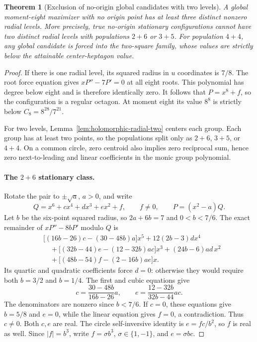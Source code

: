 \documentclass[11pt]{article}
\newtheorem{theorem}{Theorem}[section]
\theoremstyle{remark}
\numberwithin{equation}{section}
\begin{document}
\begin{theorem}[Exclusion of no-origin global candidates with two levels]
\label{thm:n8-noorigin-two-levels}
A global moment-eight maximizer with no origin point has at least
three distinct nonzero radial levels. More precisely, true no-origin
stationary configurations cannot have two distinct radial levels
with populations $2+6$ or $3+5$. For population $4+4$, any global
candidate is forced into the two-square family, whose values are
strictly below the attainable center-heptagon value.
\end{theorem}
\begin{proof}
If there is one radial level, its squared radius in $u$ coordinates
is $7/8$. The root force equation gives
$xP''-7P'=0$ at all eight roots. This polynomial has degree below
eight and is therefore identically zero. It follows that
$P=x^8+f$, so the configuration is a regular octagon. At moment eight
its value $8^8$ is strictly below $C_8=8^{28}/7^{21}$.

For two levels, Lemma~\ref{lem:holomorphic-radial-two} centers each
group. Each group has at least two points, so the populations split
only as $2+6$, $3+5$, or $4+4$. On a common circle, zero centroid
also implies zero reciprocal sum, hence zero next-to-leading and
linear coefficients in the monic group polynomial.

\paragraph{The $2+6$ stationary class.}
Rotate the pair to $\pm\sqrt a$, $a>0$, and write
\[
 Q=x^6+cx^4+dx^3+ex^2+f,\qquad f\ne0,
 \qquad P=(x^2-a)Q.
\]
Let $b$ be the six-point squared radius, so $2a+6b=7$ and
$0<b<7/6$. The exact remainder of $xP''-8bP'$ modulo $Q$ is
\begin{align*}
 &\bigl[(16b-26)c-(30-48b)a\bigr]x^5+12(2b-3)dx^4\\
 &\quad+\bigl[(32b-44)e-(12-32b)ac\bigr]x^3
 +(24b-6)ad\,x^2\\
 &\quad+\bigl[(48b-54)f-(2-16b)ae\bigr]x.
\end{align*}
Its quartic and quadratic coefficients force $d=0$: otherwise they
would require both $b=3/2$ and $b=1/4$.
The first and cubic equations give
\[
 c=\frac{30-48b}{16b-26}a,\qquad
 e=\frac{12-32b}{32b-44}ac.
\]
The denominators are nonzero since $b<7/6$. If $c=0$, these equations
give $b=5/8$ and $e=0$, while the linear equation gives $f=0$,
a contradiction. Thus $c\ne0$. Both $c,e$ are real. The circle
self-inversive identity is $e=fc/b^2$, so $f$ is real as well.
Since $|f|=b^3$, write $f=\sigma b^3$, $\sigma\in\{1,-1\}$, and
$e=\sigma bc$.


\end{proof}
\end{document}
